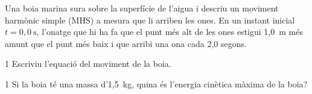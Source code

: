 Una boia marina sura sobre la superfície de l'aigua i descriu un moviment harmònic simple (MHS) a mesura que li arriben les ones. En un instant inicial $t = 0,0\ \mathrm{s}$, l'onatge que hi ha fa que el punt més alt de les ones estigui 1,0~m més amunt que el punt més baix i que arribi una ona cada 2,0 segons.

\begin{apartat}{1}
Escriviu l'equació del moviment de la boia.
\end{apartat}

\begin{apartat}{1}
Si la boia té una massa d'1,5~kg, quina és l'energia cinètica màxima de la boia?
\end{apartat}
